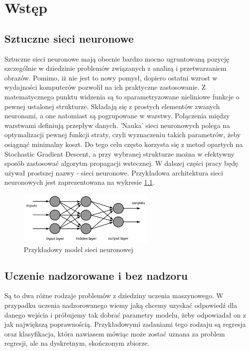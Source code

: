 \chapter{Wstęp}

\section{Sztuczne sieci neuronowe}

Sztuczne sieci neuronowe mają obecnie bardzo mocno ugruntowaną pozycję szczególnie w dziedzinie problemów związanych z analizą i przetwarzaniem obrazów. Pomimo, iż nie jest to nowy pomysł, dopiero ostatni wzrost w wydajności komputerów pozwolił na ich praktyczne zastosowanie. Z matematycznego punktu widzenia są to sparametryzowane nieliniowe funkcje o pewnej ustalonej strukturze. Składają się z prostych elementów zwanych neuronami, a one natomiast są pogrupowane w warstwy. Połączenia między warstwami definiują przepływ danych. 'Nauka' sieci neuronowych polega na optymalizacji pewnej funkcji straty, czyli wyznaczeniu takich parametrów, żeby osiągnąć minimalny koszt. Do tego celu często korzysta się z metod opartych na Stochastic Gradient Descent, a przy wybranej strukturze można w efektywny sposób zastosować algorytm propagacji wstecznej. W dalszej części pracy będę używał prostszej nazwy - sieci neuronowe. Przykładowa architektura sieci neuronowych jest zaprezentowana na wykresie \ref{fig:neural_nets}.

\begin{figure}[h!]
    \centering
    \includegraphics[width=0.6\textwidth]{images/neural_nets}
    \caption{Przykładowy model sieci neuronowej}
    \label{fig:neural_nets}
\end{figure}

\section{Uczenie nadzorowane i bez nadzoru}

Są to dwa różne rodzaje problemów z dziedziny uczenia maszynowego. W przypadku uczenia nadzorowanego wiemy jaką chcemy uzyskać odpowiedź dla danego wejścia i próbujemy tak dobrać parametry modelu, żeby odpowiadał on z jak największą poprawnością. Przykładowymi zadaniami tego rodzaju są regresja oraz klasyfikacja, która nawiasem mówiąc może zostać uznana za problem regresji, ale na dyskretnym, skończonym zbiorze.

